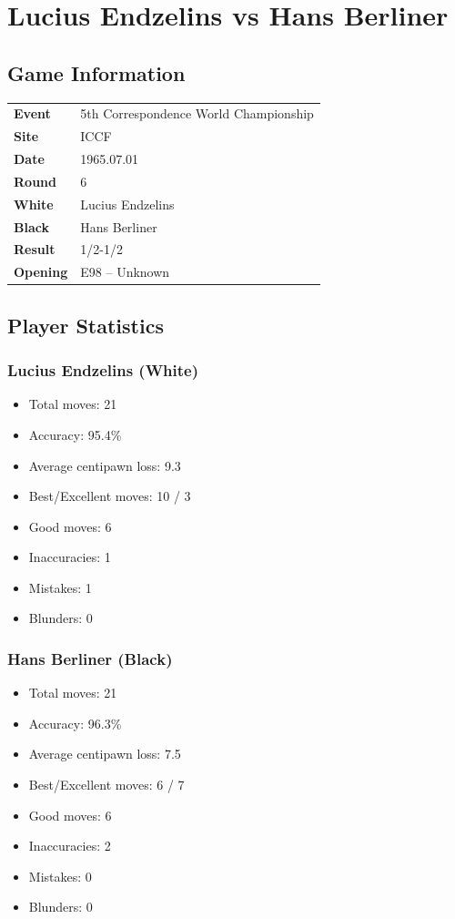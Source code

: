 \documentclass[11pt]{book}
\begin{document}
\chapter{Lucius Endzelins vs Hans Berliner}

\section{Game Information}
\begin{tabular}{ll}
\textbf{Event} & 5th Correspondence World Championship \\
\textbf{Site} & ICCF \\
\textbf{Date} & 1965.07.01 \\
\textbf{Round} & 6 \\
\textbf{White} & Lucius Endzelins \\
\textbf{Black} & Hans Berliner \\
\textbf{Result} & 1/2-1/2 \\
\textbf{Opening} & E98 -- Unknown \\
\end{tabular}

\section{Player Statistics}

\subsection{Lucius Endzelins (White)}
\begin{itemize}
\item Total moves: 21
\item Accuracy: 95.4\%
\item Average centipawn loss: 9.3
\item Best/Excellent moves: 10 / 3
\item Good moves: 6
\item Inaccuracies: 1
\item Mistakes: 1
\item Blunders: 0
\end{itemize}

\subsection{Hans Berliner (Black)}
\begin{itemize}
\item Total moves: 21
\item Accuracy: 96.3\%
\item Average centipawn loss: 7.5
\item Best/Excellent moves: 6 / 7
\item Good moves: 6
\item Inaccuracies: 2
\item Mistakes: 0
\item Blunders: 0
\end{itemize}
\end{document}
